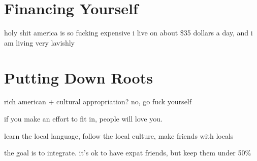 \documentclass[]{book}
\begin{document}
\chapter{Financing Yourself}

holy shit america is so fucking expensive
i live on about \$35 dollars a day, and i am living very lavishly


\chapter{Putting Down Roots}

rich american + cultural appropriation? no, go fuck yourself

if you make an effort to fit in, people will love you.

learn the local language, follow the local culture, make friends with locals

the goal is to integrate. it's ok to have expat friends, but keep them under 50\%
\end{document}
